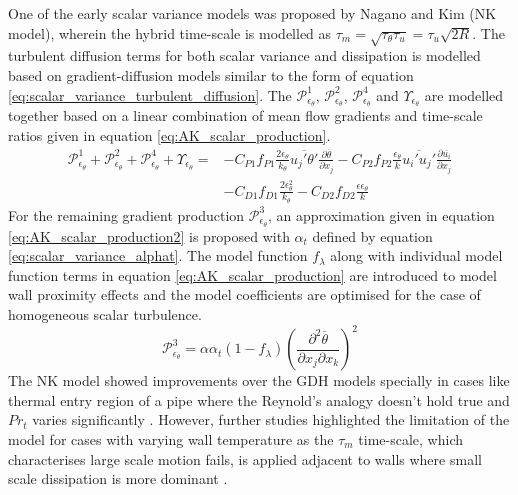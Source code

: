 One of the early scalar variance models was proposed by Nagano and Kim \cite{Nagano1988} (NK model), wherein the hybrid time-scale is modelled as $\tau_{m} = \sqrt{\tau_{\theta}\tau_{u}} = \tau_{u}\sqrt{2R}$. The turbulent diffusion terms for both scalar variance and dissipation is modelled based on gradient-diffusion models similar to the form of equation \ref{eq:scalar_variance_turbulent_diffusion}. The $\mathcal{P}_{\epsilon_{\theta}}^{1}$, $\mathcal{P}_{\epsilon_{\theta}}^{2}$, $\mathcal{P}_{\epsilon_{\theta}}^{4}$ and $\Upsilon_{\epsilon_{\theta}}$ are modelled together based on a linear combination of mean flow gradients and time-scale ratios given in equation \ref{eq:AK_scalar_production}. 
\begin{equation}
\label{eq:AK_scalar_production}
\begin{aligned}
\mathcal{P}_{\epsilon_{\theta}}^{1} + \mathcal{P}_{\epsilon_{\theta}}^{2} + \mathcal{P}_{\epsilon_{\theta}}^{4} + \Upsilon_{\epsilon_{\theta}} = {} & -C_{P1}f_{P1}\frac{2\epsilon_{\theta}}{k_{\theta}}\overline{u_{j}'\theta'}\frac{\partial \overline{\theta}}{\partial x_{j}} - C_{P2}f_{P2}\frac{\epsilon_{\theta}}{k}\overline{u_{i}'u_{j}'}\frac{\partial \overline{u_{i}}}{\partial x_{j}} \\
&- C_{D1}f_{D1}\frac{2\epsilon_{\theta}^{2}}{k_{\theta}} - C_{D2}f_{D2}\frac{\epsilon \epsilon_{\theta}}{k}
\end{aligned}
\end{equation}
For the remaining gradient production $\mathcal{P}_{\epsilon_{\theta}}^{3}$, an approximation given in equation \ref{eq:AK_scalar_production2} is proposed with $\alpha_{t}$ defined by equation \ref{eq:scalar_variance_alphat}. The model function $f_{\lambda}$ along with individual model function terms in equation \ref{eq:AK_scalar_production} are introduced to model wall proximity effects and the model coefficients are optimised for the case of homogeneous scalar turbulence.  
\begin{equation}
\label{eq:AK_scalar_production2}
\mathcal{P}_{\epsilon_{\theta}}^{3} = \alpha\alpha_{t}\left(1-f_{\lambda}\right)\left(\frac{\partial^{2} \overline{\theta}}{\partial x_{j} \partial x_{k}}\right)^{2}
\end{equation}
The NK model showed improvements over the GDH models specially in cases like thermal entry region of a pipe where the Reynold's analogy doesn't hold true and $Pr_{t}$ varies significantly \cite{Nagano1988}. However, further studies highlighted the limitation of the model for cases with varying wall temperature \cite{Yoder2016} as the $\tau_{m}$ time-scale, which characterises large scale motion fails, is applied adjacent to walls where small scale dissipation is more dominant \cite{Nagano1996}. 

